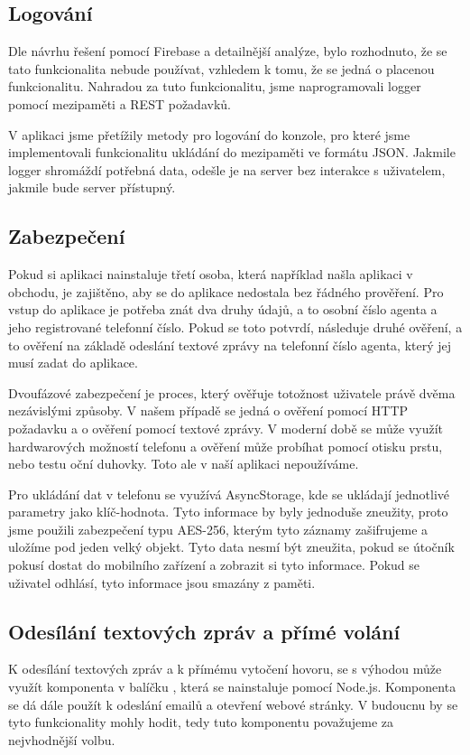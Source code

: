 \documentclass[11pt,twoside,a4paper]{book}
\begin{document}
\subsection{Logování}
Dle návrhu řešení pomocí Firebase a detailnější analýze, bylo rozhodnuto, že se tato funkcionalita nebude používat, vzhledem k tomu, že se jedná o placenou funkcionalitu. Nahradou za tuto funkcionalitu, jsme naprogramovali logger pomocí mezipaměti a REST požadavků.

V aplikaci jsme přetížily metody pro logování do konzole, pro které jsme implementovali funkcionalitu ukládání do mezipaměti ve formátu JSON. Jakmile logger shromáždí potřebná data, odešle je na server bez interakce s uživatelem, jakmile bude server přístupný.

\subsection{Zabezpečení}
\label{sec:security}
Pokud si aplikaci nainstaluje třetí osoba, která například našla aplikaci v obchodu, je zajištěno, aby se do aplikace nedostala bez řádného prověření. Pro vstup do aplikace je potřeba znát dva druhy údajů, a to osobní číslo agenta a jeho registrované telefonní číslo. Pokud se toto potvrdí, následuje druhé ověření, a to ověření na základě odeslání textové zprávy na telefonní číslo agenta, který jej musí zadat do aplikace. 

Dvoufázové zabezpečení je proces, který ověřuje totožnost uživatele právě dvěma nezávislými způsoby. V našem případě se jedná o ověření pomocí HTTP požadavku a o ověření pomocí textové zprávy. V moderní době se může využít hardwarových možností telefonu a ověření může probíhat pomocí otisku prstu, nebo testu oční duhovky. Toto ale v naší aplikaci nepoužíváme. \cite{twofactor}

Pro ukládání dat v telefonu se využívá AsyncStorage, kde se ukládají jednotlivé parametry jako klíč-hodnota. Tyto informace by byly jednoduše zneužity, proto jsme použili zabezpečení typu AES-256, kterým tyto záznamy zašifrujeme a uložíme pod jeden velký objekt. Tyto data nesmí být zneužita, pokud se útočník pokusí dostat do mobilního zařízení a zobrazit si tyto informace. Pokud se uživatel odhlásí, tyto informace jsou smazány z paměti.

\subsection{Odesílání textových zpráv a přímé volání}
K odesílání textových zpráv a k přímému vytočení hovoru, se s výhodou může využít komponenta v balíčku , která se nainstaluje pomocí Node.js. Komponenta se dá dále použít k odeslání emailů a otevření webové stránky. V budoucnu by se tyto funkcionality mohly hodit, tedy tuto komponentu považujeme za nejvhodnější volbu.
\end{document}
